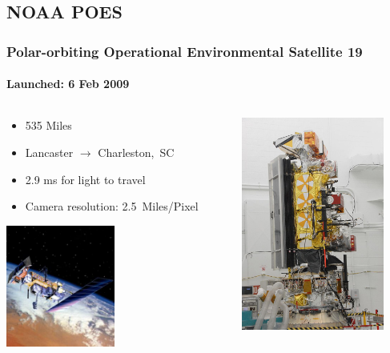 \documentclass[]{beamer}
\begin{document}
\subsection{NOAA POES}
\begin{frame}
    \frametitle{Polar-orbiting Operational Environmental Satellite 19}
    \framesubtitle{Launched: 6 Feb 2009}
    \begin{columns}[T]
        \begin{column}[T]{5.5cm}
            \begin{itemize}
                \item 535 Miles
                \item Lancaster $\to$ Charleston,~SC
                \item 2.9 ms for light to travel
                \item Camera resolution: 2.5~Miles/Pixel
            \end{itemize}
            \includegraphics[height=4cm,keepaspectratio]{images/noaa-19-sat-illus.png}
        \end{column}
        \begin{column}[T]{5cm}
            \includegraphics[height=7cm]{images/noaa19-sat.jpg}
        \end{column}
    \end{columns}
\end{frame}
\end{document}
